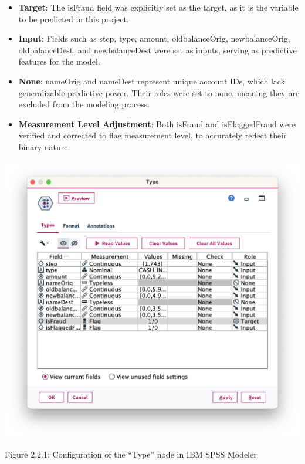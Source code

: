 \documentclass[sigplan,screen]{acmart}
\begin{document}
\sloppy
\begin{itemize} 
\item \textbf{Target}: The isFraud field was explicitly set as the target, as it is the variable to be predicted in this project.
\item \textbf{Input}: Fields such as step, type, amount, oldbalanceOrig, newbalanceOrig, oldbalanceDest, and newbalanceDest were set as inputs, serving as predictive features for the model.
\item \textbf{None}: nameOrig and nameDest represent unique account IDs, which lack generalizable predictive power. Their roles were set to none, meaning they are excluded from the modeling process.
\item \textbf{Measurement Level Adjustment}: Both isFraud and isFlaggedFraud were verified and corrected to flag measurement level, to accurately reflect their binary nature.
\end{itemize}
\fussy

\vspace{0.3cm}

\begin{center}
\includegraphics[width=0.9\columnwidth]{2.2.1.png}
\vspace{0.2cm}

Figure 2.2.1: Configuration of the ``Type'' node in IBM SPSS Modeler
\end{center}

\vspace{0.3cm}
\end{document}
